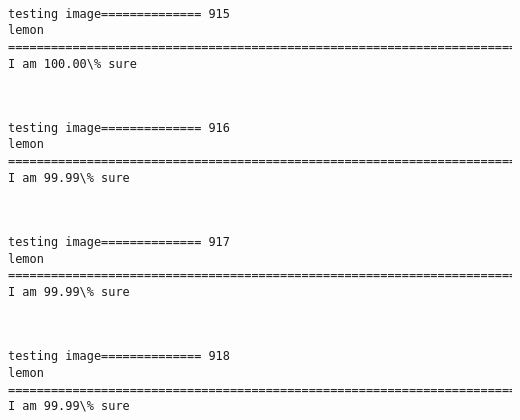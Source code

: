 \documentclass[11pt]{article}
\begin{document}
    \begin{center}
    \end{center}
    { \hspace*{\fill} \\}
    
    \begin{Verbatim}[commandchars=\\\{\}]
testing image============== 915
lemon
============================================================================
I am 100.00\% sure

    \end{Verbatim}

    \begin{center}
    \end{center}
    { \hspace*{\fill} \\}
    
    \begin{Verbatim}[commandchars=\\\{\}]
testing image============== 916
lemon
============================================================================
I am 99.99\% sure

    \end{Verbatim}

    \begin{center}
    \end{center}
    { \hspace*{\fill} \\}
    
    \begin{Verbatim}[commandchars=\\\{\}]
testing image============== 917
lemon
============================================================================
I am 99.99\% sure

    \end{Verbatim}

    \begin{center}
    \end{center}
    { \hspace*{\fill} \\}
    
    \begin{Verbatim}[commandchars=\\\{\}]
testing image============== 918
lemon
============================================================================
I am 99.99\% sure

    \end{Verbatim}
\end{document}
